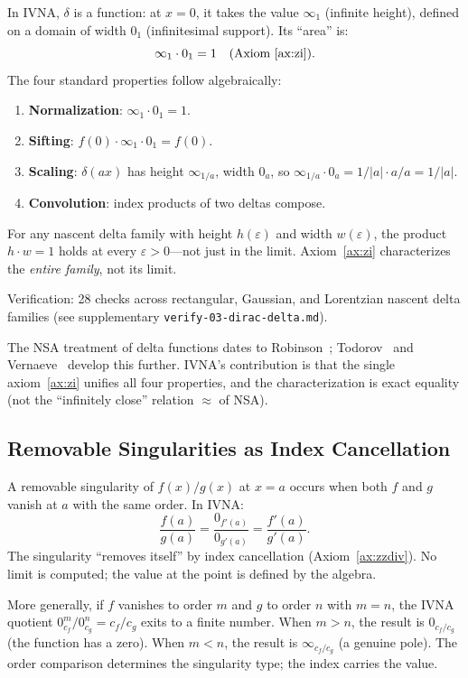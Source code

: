 \documentclass[12pt]{article}
\theoremstyle{definition}
\theoremstyle{remark}
\newcommand{\vz}[1]{0_{#1}}             %
\newcommand{\vi}[1]{\infty_{#1}}        %
\newcommand{\vzn}[2]{0^{#1}_{#2}}       %
\begin{document}
In IVNA, $\delta$ is a function: at $x = 0$, it takes the value $\vi{1}$
(infinite height), defined on a domain of width $\vz{1}$ (infinitesimal
support). Its ``area'' is:
\[
\vi{1} \cdot \vz{1} = 1 \quad \text{(Axiom~\ref{ax:zi})}.
\]
The four standard properties follow algebraically:
\begin{enumerate}
\item \textbf{Normalization}: $\vi{1} \cdot \vz{1} = 1$. \checkmark
\item \textbf{Sifting}: $f(0) \cdot \vi{1} \cdot \vz{1} = f(0)$. \checkmark
\item \textbf{Scaling}: $\delta(ax)$ has height $\vi{1/a}$, width $\vz{a}$,
  so $\vi{1/a} \cdot \vz{a} = 1/|a| \cdot a/a = 1/|a|$. \checkmark
\item \textbf{Convolution}: index products of two deltas compose. \checkmark
\end{enumerate}

For any nascent delta family with height $h(\varepsilon)$ and width
$w(\varepsilon)$, the product $h \cdot w = 1$ holds at every
$\varepsilon > 0$---not just in the limit. Axiom~\ref{ax:zi}
characterizes the \emph{entire family}, not its limit.

Verification: 28 checks across rectangular, Gaussian, and Lorentzian
nascent delta families (see supplementary
\texttt{verify-03-dirac-delta.md}).

The NSA treatment of delta functions dates to
Robinson~\cite{robinson1966}; Todorov~\cite{todorov1990} and
Vernaeve~\cite{vernaeve2025} develop this further. IVNA's
contribution is that the single axiom~\ref{ax:zi} unifies all four
properties, and the characterization is exact equality (not
the ``infinitely close'' relation $\approx$ of NSA).

\subsection{Removable Singularities as Index Cancellation}
\label{subsec:removable}

A removable singularity of $f(x)/g(x)$ at $x = a$ occurs when both
$f$ and $g$ vanish at $a$ with the same order. In IVNA:
\[
\frac{f(a)}{g(a)} = \frac{\vz{f'(a)}}{\vz{g'(a)}} = \frac{f'(a)}{g'(a)}.
\]
The singularity ``removes itself'' by index cancellation
(Axiom~\ref{ax:zzdiv}). No limit is computed; the value at the
point is defined by the algebra.

More generally, if $f$ vanishes to order $m$ and $g$ to order $n$ with
$m = n$, the IVNA quotient $\vzn{m}{c_f}/\vzn{n}{c_g} = c_f/c_g$
exits to a finite number. When $m > n$, the result is $\vz{c_f/c_g}$
(the function has a zero). When $m < n$, the result is $\vi{c_f/c_g}$
(a genuine pole). The order comparison determines the singularity type;
the index carries the value.
\end{document}
